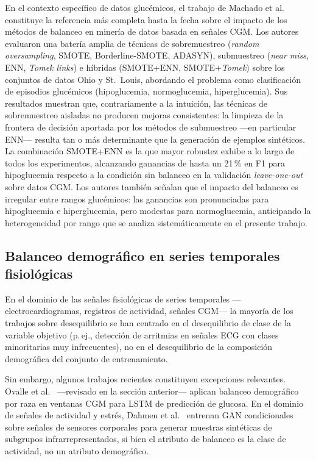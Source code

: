 En el contexto específico de datos glucémicos, el trabajo de Machado et al.\
\cite{machado2023balancing} constituye la referencia más completa hasta la fecha
sobre el impacto de los métodos de balanceo en minería de datos basada en señales
CGM. Los autores evaluaron una batería amplia de técnicas de sobremuestreo
(\emph{random oversampling}, SMOTE, Borderline-SMOTE, ADASYN), submuestreo
(\emph{near miss}, ENN, \emph{Tomek links}) e híbridas (SMOTE+ENN,
SMOTE+\emph{Tomek}) sobre los conjuntos de datos Ohio y St.~Louis, abordando el
problema como clasificación de episodios glucémicos (hipoglucemia, normoglucemia,
hiperglucemia). Sus resultados muestran que, contrariamente a la intuición, las
técnicas de sobremuestreo aisladas no producen mejoras consistentes: la limpieza
de la frontera de decisión aportada por los métodos de submuestreo —en particular
ENN— resulta tan o más determinante que la generación de ejemplos sintéticos. La
combinación SMOTE+ENN es la que mayor robustez exhibe a lo largo de todos los
experimentos, alcanzando ganancias de hasta un 21\,\% en F1 para hipoglucemia
respecto a la condición sin balanceo en la validación \emph{leave-one-out} sobre
datos CGM. Los autores también señalan que el impacto del balanceo es irregular
entre rangos glucémicos: las ganancias son pronunciadas para hipoglucemia e
hiperglucemia, pero modestas para normoglucemia, anticipando la heterogeneidad
por rango que se analiza sistemáticamente en el presente trabajo.

\subsection{Balanceo demográfico en series temporales fisiológicas}
\label{subsec:balanceo_demografico_series}

En el dominio de las señales fisiológicas de series temporales —electrocardiogramas, registros de actividad, señales CGM— la mayoría de los trabajos sobre desequilibrio se han centrado en el desequilibrio de clase de la variable objetivo (p.\,ej., detección de arritmias en señales ECG con clases minoritarias muy infrecuentes), no en el desequilibrio de la composición demográfica del conjunto de entrenamiento.

Sin embargo, algunos trabajos recientes constituyen excepciones relevantes. Ovalle et al.~\cite{ovalle2024racial} —revisado en la sección anterior— aplican balanceo demográfico por raza en ventanas CGM para LSTM de predicción de glucosa. En el dominio de señales de actividad y estrés, Dahmen et al.~\cite{dahmen2022conditionalgan} entrenan GAN condicionales sobre señales de sensores corporales para generar muestras sintéticas de subgrupos infrarrepresentados, si bien el atributo de balanceo es la clase de actividad, no un atributo demográfico.

